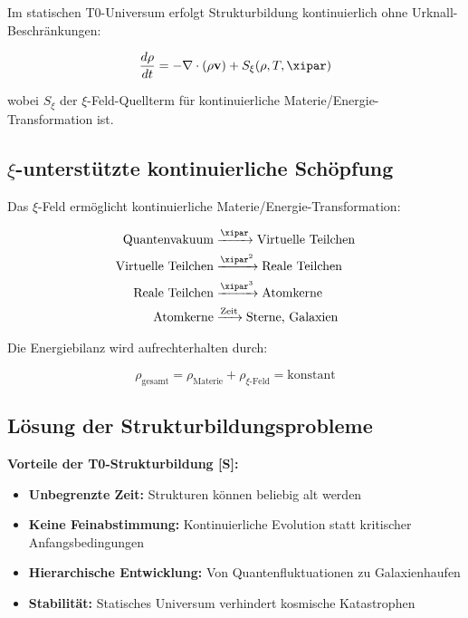 	Im statischen T0-Universum erfolgt Strukturbildung kontinuierlich ohne Urknall-Beschränkungen:
	
	\begin{equation}
		\frac{d\rho}{dt} = -\nabla \cdot (\rho \mathbf{v}) + S_\xi(\rho, T, \xipar)
	\end{equation}
	
	wobei $S_\xi$ der $\xi$-Feld-Quellterm für kontinuierliche Materie/Energie-Transformation ist.
	
	\subsection{$\xi$-unterstützte kontinuierliche Schöpfung}
	
	Das $\xi$-Feld ermöglicht kontinuierliche Materie/Energie-Transformation:
	
	\begin{align}
		\text{Quantenvakuum} &\xrightarrow{\xipar} \text{Virtuelle Teilchen} \\
		\text{Virtuelle Teilchen} &\xrightarrow{\xipar^2} \text{Reale Teilchen} \\
		\text{Reale Teilchen} &\xrightarrow{\xipar^3} \text{Atomkerne} \\
		\text{Atomkerne} &\xrightarrow{\text{Zeit}} \text{Sterne, Galaxien}
	\end{align}
	
	Die Energiebilanz wird aufrechterhalten durch:
	
	\begin{equation}
		\rho_{\text{gesamt}} = \rho_{\text{Materie}} + \rho_{\xi\text{-Feld}} = \text{konstant}
	\end{equation}
	
	\subsection{Lösung der Strukturbildungsprobleme}
	
	\begin{keyresult}
		\textbf{Vorteile der T0-Strukturbildung [S]:}
		
		\begin{itemize}
			\item \textbf{Unbegrenzte Zeit:} Strukturen können beliebig alt werden
			\item \textbf{Keine Feinabstimmung:} Kontinuierliche Evolution statt kritischer Anfangsbedingungen
			\item \textbf{Hierarchische Entwicklung:} Von Quantenfluktuationen zu Galaxienhaufen
			\item \textbf{Stabilität:} Statisches Universum verhindert kosmische Katastrophen
		\end{itemize}
	\end{keyresult}
	
